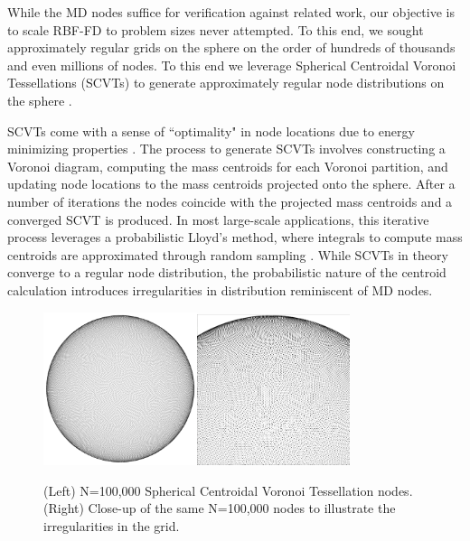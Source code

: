 \documentclass[11pt]{report}
\begin{document}
{While the MD nodes suffice for verification against related work, our objective is to scale RBF-FD to problem sizes never attempted. To this end, we sought approximately regular grids on the sphere on the order of hundreds of thousands and even millions of nodes. To this end we leverage Spherical Centroidal Voronoi Tessellations (SCVTs) to generate approximately regular node distributions on the sphere \cite{Du2003b, Womeldorff2008}. 

SCVTs come with a sense of ``optimality" in node locations due to energy minimizing properties \cite{Du2003b}. The process to generate SCVTs involves constructing a Voronoi diagram, computing the mass centroids for each Voronoi partition, and updating node locations to the mass centroids projected onto the sphere. After a number of iterations the nodes coincide with the projected mass centroids and a converged SCVT is produced. In most large-scale applications, this iterative process leverages a probabilistic Lloyd's method, where integrals to compute mass centroids are approximated through random sampling \cite{Womeldorff2008, Du2003b}. While SCVTs in theory converge to a regular node distribution, the probabilistic nature of the centroid calculation introduces irregularities in distribution reminiscent of MD nodes. 

\begin{figure} 
\centering
\includegraphics[width=0.4\textwidth]{rbffd_methods_content/grids/N100000_points.png}\includegraphics[width=0.4\textwidth]{rbffd_methods_content/grids/N100000_closeup.png} 
\caption{(Left) N=100,000 Spherical Centroidal Voronoi Tessellation nodes. (Right) Close-up of the same N=100,000 nodes to illustrate the irregularities in the grid.} 
\label{fig:scvt_nodes}
\end{figure}

}
\end{document}
